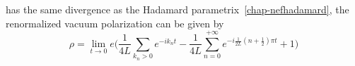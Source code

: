 has the same divergence as the Hadamard parametrix~\cref{chap-nefhadamard}, the renormalized vacuum polarization can be given by
\begin{equation*}
\rho =\lim_{t\rightarrow 0} e \bigg(\frac{1}{4L}\sum_{k_n>0} e^{-ik_nt} 
- \frac{ 1}{ 4L}\sum_{n=0}^{+\infty} e^{-i\frac{1}{2L}(n+\frac 1 2 ) \pi t} + 1 \bigg)
\end{equation*}















